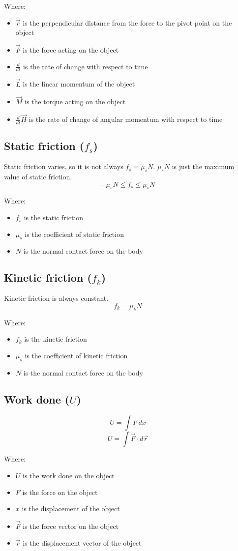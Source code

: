 \documentclass[11pt]{article}
\begin{document}
Where:
\begin{itemize}
\item \(\vec{r}\) is the perpendicular distance from the force to the pivot point on the object
\item \(\vec{F}\) is the force acting on the object
\item \(\frac{d}{dt}\) is the rate of change with respect to time
\item \(\vec{L}\) is the linear momentum of the object
\item \(\vec{M}\) is the torque acting on the object
\item \(\frac{d}{dt} \vec{H}\) is the rate of change of angular momentum with respect to time
\end{itemize}
\subsection{Static friction (\(f_s\))}
\label{sec:orgea97fea}
Static friction varies, so it is not always \(f_s = \mu_s N\).
\(\mu_s N\) is just the maximum value of static friction.
\[-\mu_s N \le f_s \le \mu_s N\]

Where:
\begin{itemize}
\item \(f_s\) is the static friction
\item \(\mu_s\) is the coefficient of static friction
\item \(N\) is the normal contact force on the body
\end{itemize}
\subsection{Kinetic friction (\(f_k\))}
\label{sec:org651a94c}
Kinetic friction is always constant.
\[f_k = \mu_k N\]

Where:
\begin{itemize}
\item \(f_k\) is the kinetic friction
\item \(\mu_s\) is the coefficient of kinetic friction
\item \(N\) is the normal contact force on the body
\end{itemize}
\subsection{Work done (\(U\))}
\label{sec:org1aa772f}
\[U = \int F \, dx\]
\[U = \int \vec{F} \cdot d \vec{r}\]

Where:
\begin{itemize}
\item \(U\) is the work done on the object
\item \(F\) is the force on the object
\item \(x\) is the displacement of the object
\item \(\vec{F}\) is the force vector on the object
\item \(\vec{r}\) is the displacement vector of the object
\end{itemize}
\end{document}
